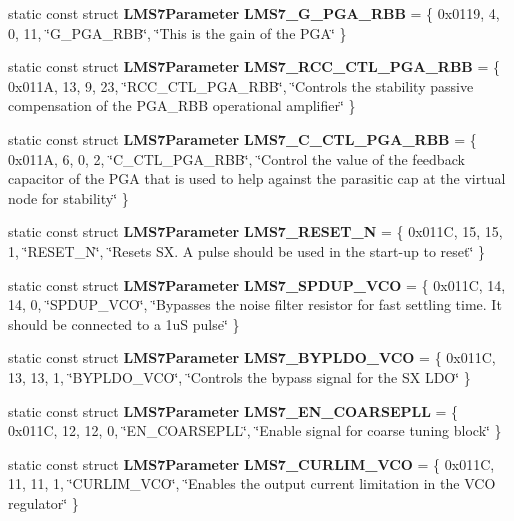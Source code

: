 \begin{DoxyCompactItemize}
\item 
static const struct {\bf L\+M\+S7\+Parameter} {\bf L\+M\+S7\+\_\+\+G\+\_\+\+P\+G\+A\+\_\+\+R\+BB} = \{ 0x0119, 4, 0, 11, \char`\"{}\+G\+\_\+\+P\+G\+A\+\_\+\+R\+B\+B\char`\"{}, \char`\"{}\+This is the gain of the P\+G\+A\char`\"{} \}
\item 
static const struct {\bf L\+M\+S7\+Parameter} {\bf L\+M\+S7\+\_\+\+R\+C\+C\+\_\+\+C\+T\+L\+\_\+\+P\+G\+A\+\_\+\+R\+BB} = \{ 0x011\+A, 13, 9, 23, \char`\"{}\+R\+C\+C\+\_\+\+C\+T\+L\+\_\+\+P\+G\+A\+\_\+\+R\+B\+B\char`\"{}, \char`\"{}\+Controls the stability passive compensation of the P\+G\+A\+\_\+\+R\+B\+B operational amplifier\char`\"{} \}
\item 
static const struct {\bf L\+M\+S7\+Parameter} {\bf L\+M\+S7\+\_\+\+C\+\_\+\+C\+T\+L\+\_\+\+P\+G\+A\+\_\+\+R\+BB} = \{ 0x011\+A, 6, 0, 2, \char`\"{}\+C\+\_\+\+C\+T\+L\+\_\+\+P\+G\+A\+\_\+\+R\+B\+B\char`\"{}, \char`\"{}\+Control the value of the feedback capacitor of the P\+G\+A that is used to help against the parasitic cap at the virtual node for stability\char`\"{} \}
\item 
static const struct {\bf L\+M\+S7\+Parameter} {\bf L\+M\+S7\+\_\+\+R\+E\+S\+E\+T\+\_\+N} = \{ 0x011\+C, 15, 15, 1, \char`\"{}\+R\+E\+S\+E\+T\+\_\+\+N\char`\"{}, \char`\"{}\+Resets S\+X. A pulse should be used in the start-\/up to reset\char`\"{} \}
\item 
static const struct {\bf L\+M\+S7\+Parameter} {\bf L\+M\+S7\+\_\+\+S\+P\+D\+U\+P\+\_\+\+V\+CO} = \{ 0x011\+C, 14, 14, 0, \char`\"{}\+S\+P\+D\+U\+P\+\_\+\+V\+C\+O\char`\"{}, \char`\"{}\+Bypasses the noise filter resistor for fast settling time. It should be connected to a 1u\+S pulse\char`\"{} \}
\item 
static const struct {\bf L\+M\+S7\+Parameter} {\bf L\+M\+S7\+\_\+\+B\+Y\+P\+L\+D\+O\+\_\+\+V\+CO} = \{ 0x011\+C, 13, 13, 1, \char`\"{}\+B\+Y\+P\+L\+D\+O\+\_\+\+V\+C\+O\char`\"{}, \char`\"{}\+Controls the bypass signal for the S\+X L\+D\+O\char`\"{} \}
\item 
static const struct {\bf L\+M\+S7\+Parameter} {\bf L\+M\+S7\+\_\+\+E\+N\+\_\+\+C\+O\+A\+R\+S\+E\+P\+LL} = \{ 0x011\+C, 12, 12, 0, \char`\"{}\+E\+N\+\_\+\+C\+O\+A\+R\+S\+E\+P\+L\+L\char`\"{}, \char`\"{}\+Enable signal for coarse tuning block\char`\"{} \}
\item 
static const struct {\bf L\+M\+S7\+Parameter} {\bf L\+M\+S7\+\_\+\+C\+U\+R\+L\+I\+M\+\_\+\+V\+CO} = \{ 0x011\+C, 11, 11, 1, \char`\"{}\+C\+U\+R\+L\+I\+M\+\_\+\+V\+C\+O\char`\"{}, \char`\"{}\+Enables the output current limitation in the V\+C\+O regulator\char`\"{} \}

\end{DoxyCompactItemize}
